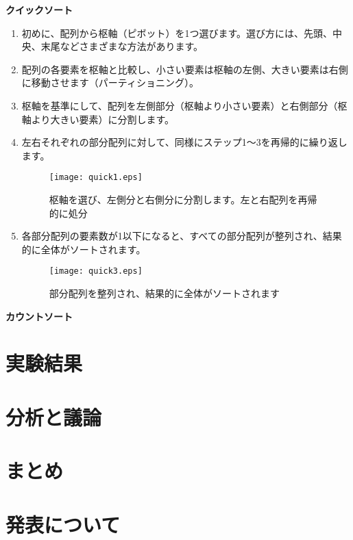 \documentclass[a4j, 12pt]{jarticle}
\begin{document}
\textbf{クイックソート}
\begin{enumerate}
  \item 初めに、配列から枢軸（ピボット）を1つ選びます。選び方には、先頭、中央、末尾などさまざまな方法があります。
  \item 配列の各要素を枢軸と比較し、小さい要素は枢軸の左側、大きい要素は右側に移動させます（パーティショニング）。
  \item 枢軸を基準にして、配列を左側部分（枢軸より小さい要素）と右側部分（枢軸より大きい要素）に分割します。
  \item 左右それぞれの部分配列に対して、同様にステップ1～3を再帰的に繰り返します。
  \begin{figure}[H]
    \centering
    \texttt{[image: quick1.eps]}
    \caption{枢軸を選び、左側分と右側分に分割します。左と右配列を再帰的に処分}
  \end{figure}
  \item 各部分配列の要素数が1以下になると、すべての部分配列が整列され、結果的に全体がソートされます。
  \begin{figure}[H]
    \centering
    \texttt{[image: quick3.eps]}
    \caption{部分配列を整列され、結果的に全体がソートされます}
  \end{figure}
\end{enumerate}
\textbf{カウントソート}

\section{実験結果}
\section{分析と議論}
\section{まとめ}
\section{発表について}



\end{document}
